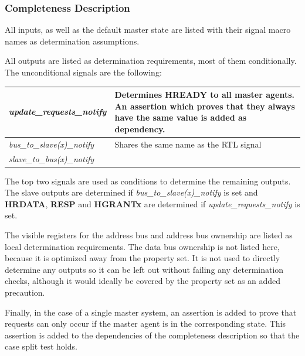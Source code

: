 \subsubsection{Completeness Description}
All inputs, as well as the default master state are listed with their signal macro names as determination assumptions. \par
All outputs are listed as determination requirements, most of them conditionally. The unconditional signals are the following: \\

\begin{tabular}{p{4.3cm} | p{10cm}}
\textit{update\_requests\_notify} & Determines \textbf{HREADY} to all master agents. An assertion which proves that they always have the same value is added as dependency. \\
\hline
\textit{bus\_to\_slave(x)\_notify} & Shares the same name as the RTL signal \\
\textit{slave\_to\_bus(x)\_notify} &  \\
\end{tabular}

The top two signals are used as conditions to determine the remaining outputs. The slave outputs are determined if \textit{bus\_to\_slave(x)\_notify} is set and \textbf{HRDATA}, \textbf{RESP} and \textbf{HGRANTx} are determined if \textit{update\_requests\_notify} is set. \par

The visible registers for the address bus and address bus ownership are listed as local determination requirements. The data bus ownership is not listed here, because it is optimized away from the property set. It is not used to directly determine any outputs so it can be left out without failing any determination checks, although it would ideally be covered by the property set as an added precaution. \par
Finally, in the case of a single master system, an assertion is added to prove that requests can only occur if the master agent is in the corresponding state. This assertion is added to the dependencies of the completeness description so that the case split test holds. 

